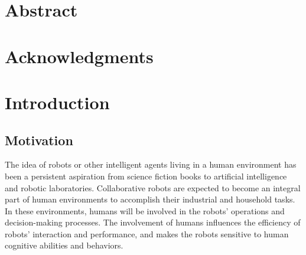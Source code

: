 \documentclass[12pt]{report}
\begin{document}

\chapter*{Abstract}


\pagebreak

\chapter*{Acknowledgments}


\pagebreak

\tableofcontents
\pagebreak

\listoffigures
\pagebreak

\listoftables
\pagebreak



\chapter{Introduction}
\label{ch:introduction}

\section{Motivation}

The idea of robots or other intelligent agents living in a human environment has
been a persistent aspiration from science fiction books to artificial
intelligence and robotic laboratories. Collaborative robots are expected to
become an integral part of human environments to accomplish their industrial
and household tasks. In these environments, humans will be involved in
the robots' operations and decision-making processes. The involvement of humans
influences the efficiency of robots' interaction and performance, and makes the
robots sensitive to human cognitive abilities and behaviors.
\end{document}
